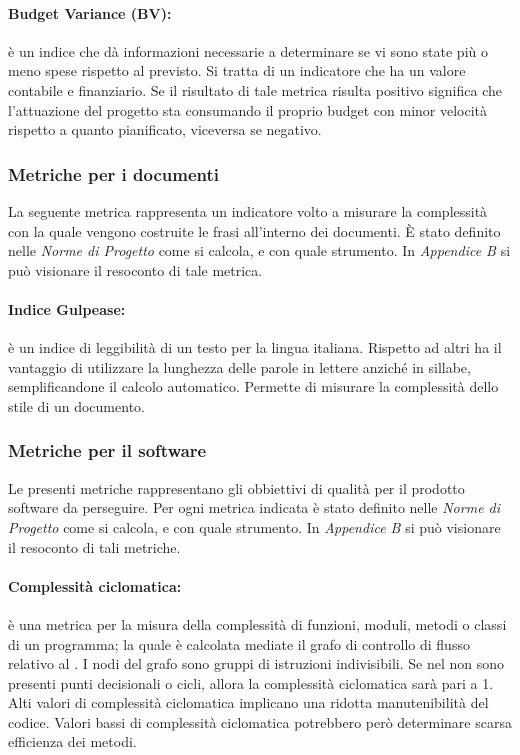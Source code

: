 \paragraph{Budget Variance (BV):} è un indice che dà informazioni necessarie a determinare se vi sono state più o meno spese rispetto al previsto. Si tratta di un indicatore che ha un valore contabile e finanziario. Se il risultato di tale metrica risulta positivo significa che l'attuazione del progetto sta consumando il proprio budget con minor velocità rispetto a quanto pianificato, viceversa se negativo.

\subsubsection{Metriche per i documenti}
La seguente metrica rappresenta un indicatore volto a misurare la complessità con la quale vengono costruite le frasi all'interno dei documenti.
È stato definito nelle \emph{Norme di Progetto \VersioneNP{}} come si calcola, e con quale strumento. In \emph{Appendice B} si può visionare il resoconto di tale metrica.

\paragraph{Indice Gulpease:} è un indice di leggibilità di un testo per la lingua italiana.
Rispetto ad altri ha il vantaggio di utilizzare la lunghezza delle parole in lettere anziché in sillabe, semplificandone il calcolo automatico. Permette di misurare la complessità dello stile di un documento.

\subsubsection{Metriche per il software}
Le presenti metriche rappresentano gli obbiettivi di qualità per il prodotto software da perseguire.
Per ogni metrica indicata è stato definito nelle \emph{Norme di Progetto \VersioneNP{}} come si calcola, e con quale strumento. In \emph{Appendice B} si può visionare il resoconto di tali metriche.

\paragraph{Complessità ciclomatica:} è una metrica per la misura della complessità di funzioni, moduli, metodi o classi di un programma; la quale è calcolata mediate il grafo di controllo di flusso relativo al .
            I nodi del grafo sono gruppi di istruzioni indivisibili. Se nel  non sono presenti punti decisionali o cicli, allora la complessità ciclomatica sarà pari a 1.
            Alti valori di complessità ciclomatica implicano una ridotta manutenibilità del codice. Valori bassi di complessità ciclomatica potrebbero però determinare scarsa efficienza dei metodi.

